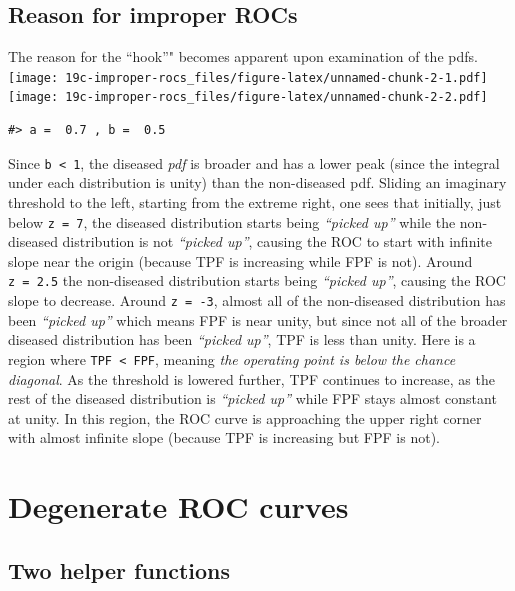 \documentclass[
]{book}
\begin{document}
\hypertarget{reason-for-improper-rocs}{%
\section{Reason for improper ROCs}\label{reason-for-improper-rocs}}

The reason for the ``hook''" becomes apparent upon examination of the pdfs.
\texttt{[image: 19c-improper-rocs\_files/figure-latex/unnamed-chunk-2-1.pdf]} \texttt{[image: 19c-improper-rocs\_files/figure-latex/unnamed-chunk-2-2.pdf]}

\begin{verbatim}
#> a =  0.7 , b =  0.5
\end{verbatim}

Since \texttt{b\ \textless{}\ 1}, the diseased \emph{pdf} is broader and has a lower peak (since the integral under each distribution is unity) than the non-diseased pdf. Sliding an imaginary threshold to the left, starting from the extreme right, one sees that initially, just below \texttt{z\ =\ 7}, the diseased distribution starts being \emph{``picked up''} while the non-diseased distribution is not \emph{``picked up''}, causing the ROC to start with infinite slope near the origin (because TPF is increasing while FPF is not). Around \texttt{z\ =\ 2.5} the non-diseased distribution starts being \emph{``picked up''}, causing the ROC slope to decrease. Around \texttt{z\ =\ -3}, almost all of the non-diseased distribution has been \emph{``picked up''} which means FPF is near unity, but since not all of the broader diseased distribution has been \emph{``picked up''}, TPF is less than unity. Here is a region where \texttt{TPF\ \textless{}\ FPF}, meaning \emph{the operating point is below the chance diagonal}. As the threshold is lowered further, TPF continues to increase, as the rest of the diseased distribution is \emph{``picked up''} while FPF stays almost constant at unity. In this region, the ROC curve is approaching the upper right corner with almost infinite slope (because TPF is increasing but FPF is not).

\hypertarget{degenerate-rocs}{%
\chapter{Degenerate ROC curves}\label{degenerate-rocs}}

\hypertarget{two-helper-functions}{%
\section{Two helper functions}\label{two-helper-functions}}
\end{document}
